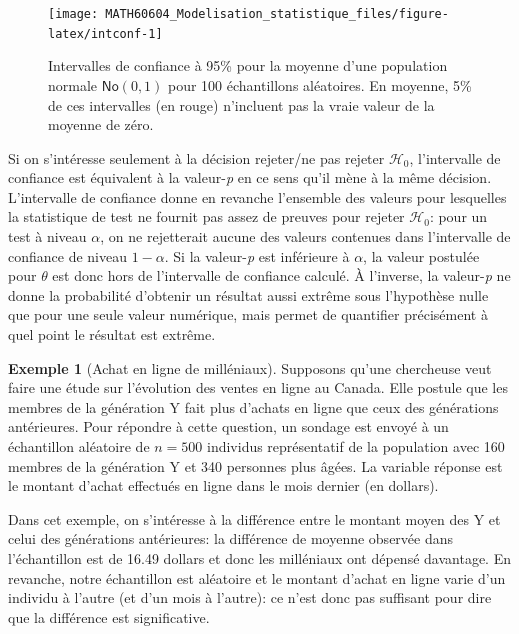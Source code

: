 \documentclass[
  11pt,
  letterpaper,
]{article}
\theoremstyle{definition}
\theoremstyle{definition}
\newtheorem{example}{Exemple}[section]
\theoremstyle{definition}
\theoremstyle{definition}
\theoremstyle{remark}
\begin{document}
\begin{figure}

{\centering \texttt{[image: MATH60604\_Modelisation\_statistique\_files/figure-latex/intconf-1]} 

}

\caption{Intervalles de confiance à 95\% pour la moyenne d'une population normale $\mathsf{No}(0,1)$ pour 100 échantillons aléatoires. En moyenne, 5\% de ces intervalles (en rouge) n'incluent pas la vraie valeur de la moyenne de zéro.}\label{fig:intconf}
\end{figure}

Si on s'intéresse seulement à la décision rejeter/ne pas rejeter \(\mathscr{H}_0\), l'intervalle de confiance est équivalent à la valeur-\emph{p} en ce sens qu'il mène à la même décision. L'intervalle de confiance donne en revanche l'ensemble des valeurs pour lesquelles la statistique de test ne fournit pas assez de preuves pour rejeter \(\mathscr{H}_0\): pour un test à niveau \(\alpha\), on ne rejetterait aucune des valeurs contenues dans l'intervalle de confiance de niveau \(1-\alpha\). Si la valeur-\emph{p} est inférieure à \(\alpha\), la valeur postulée pour \(\theta\) est donc hors de l'intervalle de confiance calculé. À l'inverse, la valeur-\emph{p} ne donne la probabilité d'obtenir un résultat aussi extrême sous l'hypothèse nulle que pour une seule valeur numérique, mais permet de quantifier précisément à quel point le résultat est extrême.

\begin{example}[Achat en ligne de milléniaux]
\protect\hypertarget{exm:achats-milleniaux}{}\label{exm:achats-milleniaux}Supposons qu'une chercheuse veut faire une étude sur l'évolution des ventes en ligne au Canada. Elle postule que les membres de la génération Y fait plus d'achats en ligne que ceux des générations antérieures. Pour répondre à cette question, un sondage est envoyé à un échantillon aléatoire de \(n=500\) individus représentatif de la population avec 160 membres de la génération Y et 340 personnes plus âgées. La variable réponse est le montant d'achat effectués en ligne dans le mois dernier (en dollars).
\end{example}

Dans cet exemple, on s'intéresse à la différence entre le montant moyen des Y et celui des générations antérieures: la différence de moyenne observée dans l'échantillon est de 16.49 dollars et donc les milléniaux ont dépensé davantage. En revanche, notre échantillon est aléatoire et le montant d'achat en ligne varie d'un individu à l'autre (et d'un mois à l'autre): ce n'est donc pas suffisant pour dire que la différence est significative.
\end{document}
